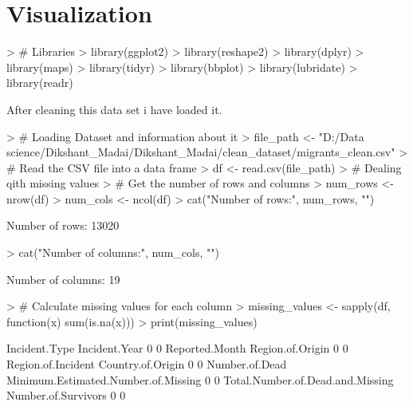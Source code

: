 \documentclass{article}
\begin{document}
\newpage
\section{Visualization}
\begin{Schunk}
\begin{Sinput}
> # Libraries
> library(ggplot2)
> library(reshape2)
> library(dplyr)
> library(maps)
> library(tidyr)
> library(bbplot) 
> library(lubridate)
> library(readr)
\end{Sinput}
\end{Schunk}

After cleaning this data set i have loaded it.
\begin{Schunk}
\begin{Sinput}
> # Loading Dataset and information about it
> file_path <- "D:/Data science/Dikshant_Madai/Dikshant_Madai/clean_dataset/migrants_clean.csv"
> # Read the CSV file into a data frame
> df <- read.csv(file_path)
> # Dealing qith missing values
> # Get the number of rows and columns
> num_rows <- nrow(df)
> num_cols <- ncol(df)
> cat("Number of rows:", num_rows, "\n")
\end{Sinput}
\begin{Soutput}
Number of rows: 13020 
\end{Soutput}
\begin{Sinput}
> cat("Number of columns:", num_cols, "\n")
\end{Sinput}
\begin{Soutput}
Number of columns: 19 
\end{Soutput}
\begin{Sinput}
> # Calculate missing values for each column
> missing_values <- sapply(df, function(x) sum(is.na(x)))
> print(missing_values)
\end{Sinput}
\begin{Soutput}
                      Incident.Type                       Incident.Year 
                                  0                                   0 
                     Reported.Month                    Region.of.Origin 
                                  0                                   0 
                 Region.of.Incident                   Country.of.Origin 
                                  0                                   0 
                     Number.of.Dead Minimum.Estimated.Number.of.Missing 
                                  0                                   0 
   Total.Number.of.Dead.and.Missing                 Number.of.Survivors 
                                  0                                   0 

\end{Soutput}
\end{Schunk}
\end{document}
